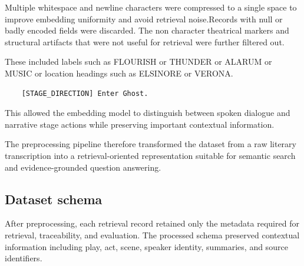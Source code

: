 \documentclass[10pt,conference]{IEEEtran}
\begin{document}
Multiple whitespace and newline characters were compressed to a single space to improve embedding uniformity and avoid retrieval noise.Records with null or badly encoded fields were discarded. The non character theatrical markers and structural artifacts that were not useful for retrieval were further filtered out.

These included labels such as {FLOURISH} or {THUNDER} or {ALARUM} or {MUSIC} or location headings such as {ELSINORE} or {VERONA}.

\begin{verbatim}
	[STAGE_DIRECTION] Enter Ghost.
\end{verbatim}

This allowed the embedding model to distinguish between spoken dialogue and narrative stage actions while preserving important contextual information.

The preprocessing pipeline therefore transformed the dataset from a raw literary transcription into a retrieval-oriented representation suitable for semantic search and evidence-grounded question answering.


\subsection{Dataset schema}

After preprocessing, each retrieval record retained only the metadata required for retrieval, traceability, and evaluation. The processed schema preserved contextual information including play, act, scene, speaker identity, summaries, and source identifiers.
\end{document}
